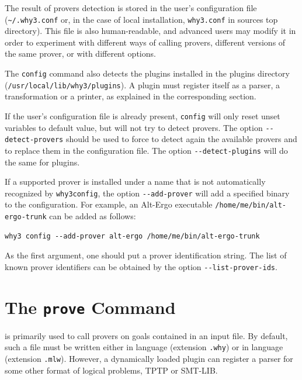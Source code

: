 The result of provers detection is stored in the user's
configuration file (\verb+~/.why3.conf+ or, in the case of local
installation, \verb+why3.conf+ in \why sources top directory). This file
is also human-readable, and advanced users may modify it in order to
experiment with different ways of calling provers, \eg different
versions of the same prover, or with different options.

The \texttt{config} command also detects the plugins installed in the \why
plugins directory (\eg \texttt{/usr/local/lib/why3/plugins}). A
plugin must register itself as a parser, a transformation or a
printer, as explained in the corresponding section.

If the user's configuration file is already present,
\texttt{config} will only reset unset variables to default value,
but will not try to detect provers.
The option \verb|--detect-provers| should be used to force
\why to detect again the available
provers and to replace them in the configuration file. The option
\verb|--detect-plugins| will do the same for plugins.

If a supported prover is installed under a name
that is not automatically recognized by \texttt{why3config},
the option \verb|--add-prover| will add a specified binary
to the configuration. For example, an Alt-Ergo executable
\verb|/home/me/bin/alt-ergo-trunk| can be added as follows:
\begin{verbatim}
why3 config --add-prover alt-ergo /home/me/bin/alt-ergo-trunk
\end{verbatim}
As the first argument, one should put a prover
identification string. The list of known prover identifiers
can be obtained by the option \verb|--list-prover-ids|.

\section{The \texttt{prove} Command}
\label{sec:why3ref}

\why is primarily used to call provers on goals contained in an
input file. By default, such a file must be written either in \why language
(extension \texttt{.why}) or in \whyml language (extension \texttt{.mlw}).
However, a dynamically loaded
plugin can register a parser for some other format of logical problems,
\eg TPTP or SMT-LIB.

